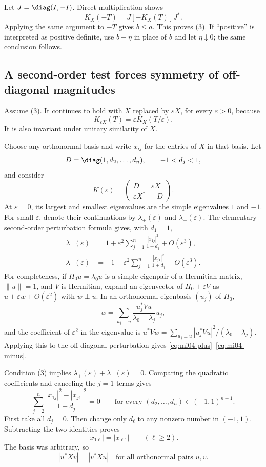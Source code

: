 Let $J=\diag(I,-I)$. Direct multiplication shows
\[
 K_X(-T)=J[-K_X(T)]J^*.
\]
Applying the same argument to $-T$ gives $b\leq a$. This proves (3).
If ``positive'' is interpreted as positive definite, use $b+\eta$ in place of $b$ and let $\eta\downarrow0$; the same conclusion follows.

\subsection{A second-order test forces symmetry of off-diagonal magnitudes}

Assume (3). It continues to hold with $X$ replaced by $\varepsilon X$, for every $\varepsilon>0$, because
\[
 K_{\varepsilon X}(T)=\varepsilon K_X(T/\varepsilon).
\]
It is also invariant under unitary similarity of $X$.

Choose any orthonormal basis and write $x_{ij}$ for the entries of $X$ in that basis. Let
\[
 D=\diag(1,d_2,\ldots,d_n),\qquad -1<d_j<1,
\]
and consider
\[
 K(\varepsilon)=\begin{pmatrix}D&\varepsilon X\\\varepsilon X^*&-D\end{pmatrix}.
\]
At $\varepsilon=0$, its largest and smallest eigenvalues are the simple eigenvalues $1$ and $-1$. For small $\varepsilon$, denote their continuations by $\lambda_+(\varepsilon)$ and $\lambda_-(\varepsilon)$. The elementary second-order perturbation formula gives, with $d_1=1$,
\begin{align}
 \lambda_+(\varepsilon)
 &=1+\varepsilon^2\sum_{j=1}^n\frac{|x_{1j}|^2}{1+d_j}
   +O(\varepsilon^3),\label{eq:mi04-plus}\\
 \lambda_-(\varepsilon)
 &=-1-\varepsilon^2\sum_{j=1}^n\frac{|x_{j1}|^2}{1+d_j}
   +O(\varepsilon^3).\label{eq:mi04-minus}
\end{align}
For completeness, if $H_0u=\lambda_0u$ is a simple eigenpair of a Hermitian matrix, $\|u\|=1$, and $V$ is Hermitian, expand an eigenvector of $H_0+\varepsilon V$ as $u+\varepsilon w+O(\varepsilon^2)$ with $w\perp u$. In an orthonormal eigenbasis $(u_j)$ of $H_0$,
\[
 w=\sum_{u_j\perp u}\frac{u_j^*Vu}{\lambda_0-\lambda_j}u_j,
\]
and the coefficient of $\varepsilon^2$ in the eigenvalue is
$u^*Vw=\sum_{u_j\perp u}|u_j^*Vu|^2/(\lambda_0-\lambda_j)$.
Applying this to the off-diagonal perturbation gives \eqref{eq:mi04-plus}--\eqref{eq:mi04-minus}.

Condition (3) implies $\lambda_+(\varepsilon)+\lambda_-(\varepsilon)=0$. Comparing the quadratic coefficients and canceling the $j=1$ terms gives
\begin{equation}\label{eq:mi04-weights}
 \sum_{j=2}^n\frac{|x_{1j}|^2-|x_{j1}|^2}{1+d_j}=0
 \qquad\text{for every }(d_2,\ldots,d_n)\in(-1,1)^{n-1}.
\end{equation}
First take all $d_j=0$. Then change only $d_\ell$ to any nonzero number in $(-1,1)$. Subtracting the two identities proves
\[
 |x_{1\ell}|=|x_{\ell1}|\qquad(\ell\geq2).
\]
The basis was arbitrary, so
\begin{equation}\label{eq:mi04-pair}
 |u^*Xv|=|v^*Xu|
 \quad\text{for all orthonormal pairs }u,v.
\end{equation}

